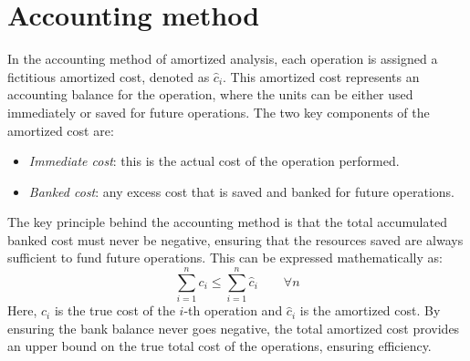 \section{Accounting method}

In the accounting method of amortized analysis, each operation is assigned a fictitious amortized cost, denoted as $\hat{c}_i$.
This amortized cost represents an accounting balance for the operation, where the units can be either used immediately or saved for future operations. 
The two key components of the amortized cost are:
\begin{itemize}
    \item \textit{Immediate cost}: this is the actual cost of the operation performed.
    \item \textit{Banked cost}: any excess cost that is saved and banked for future operations.
\end{itemize}
The key principle behind the accounting method is that the total accumulated banked cost must never be negative, ensuring that the resources saved are always sufficient to fund future operations.
This can be expressed mathematically as:
\[\sum_{i=1}^nc_i\leq\sum_{i=1}^n\hat{c}_i \qquad\forall n\]
Here, $c_i$  is the true cost of the $i$-th operation and $\hat{c}_i$ is the amortized cost.
By ensuring the bank balance never goes negative, the total amortized cost provides an upper bound on the true total cost of the operations, ensuring efficiency.

